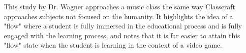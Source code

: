 This study by Dr. Wagner approaches a music class the same way Classcraft approaches subjects not focused on the humanity. It highlights the idea of a "flow" where a student is fully immersed in the educational process and is fully engaged with the learning process, and notes that it is far easier to attain this "flow" state when the student is learning in the context of a video game.